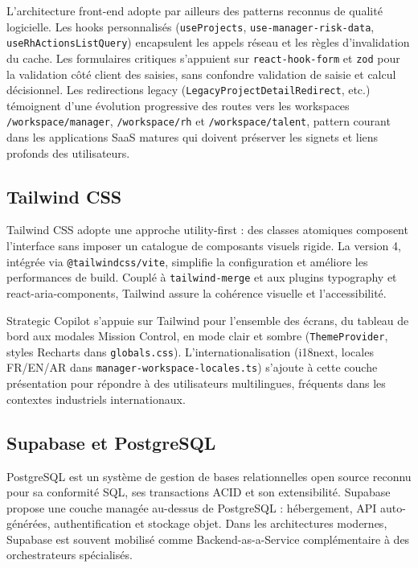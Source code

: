 L'architecture front-end adopte par ailleurs des patterns reconnus de qualité logicielle. Les hooks personnalisés (\texttt{useProjects}, \texttt{use-manager-risk-data}, \texttt{useRhActionsListQuery}) encapsulent les appels réseau et les règles d'invalidation du cache. Les formulaires critiques s'appuient sur \texttt{react-hook-form} et \texttt{zod} pour la validation côté client des saisies, sans confondre validation de saisie et calcul décisionnel. Les redirections legacy (\texttt{LegacyProjectDetailRedirect}, etc.) témoignent d'une évolution progressive des routes vers les workspaces \texttt{/workspace/manager}, \texttt{/workspace/rh} et \texttt{/workspace/talent}, pattern courant dans les applications SaaS matures qui doivent préserver les signets et liens profonds des utilisateurs.

\subsection{Tailwind CSS}

Tailwind CSS \cite{tailwind2025} adopte une approche utility-first : des classes atomiques composent l'interface sans imposer un catalogue de composants visuels rigide. La version 4, intégrée via \texttt{@tailwindcss/vite}, simplifie la configuration et améliore les performances de build. Couplé à \texttt{tailwind-merge} et aux plugins typography et react-aria-components, Tailwind assure la cohérence visuelle et l'accessibilité.

Strategic Copilot s'appuie sur Tailwind pour l'ensemble des écrans, du tableau de bord aux modales Mission Control, en mode clair et sombre (\texttt{ThemeProvider}, styles Recharts dans \texttt{globals.css}). L'internationalisation (i18next, locales FR/EN/AR dans \texttt{manager-workspace-locales.ts}) s'ajoute à cette couche présentation pour répondre à des utilisateurs multilingues, fréquents dans les contextes industriels internationaux.

\subsection{Supabase et PostgreSQL}

PostgreSQL \cite{postgresql2025,stonebraker2011} est un système de gestion de bases relationnelles open source reconnu pour sa conformité SQL, ses transactions ACID et son extensibilité. Supabase propose une couche managée au-dessus de PostgreSQL : hébergement, API auto-générées, authentification et stockage objet. Dans les architectures modernes, Supabase est souvent mobilisé comme Backend-as-a-Service complémentaire à des orchestrateurs spécialisés.

